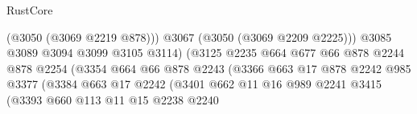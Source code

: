 \begin{lexlean}{RustCore}
\begin{coremodule}
                                                (@3050 (@3069 @2219 @878)))
                                              @3067
                                              (@3050 (@3069 @2209 @2225)))
                                            @3085
                                            @3089
                                            @3094
                                            @3099
                                            @3105
                                            @3114)
                                          (@3125
                                            @2235
                                            @664
                                            @677
                                            @66
                                            @878
                                            @2244
                                            @878
                                            @2254
                                            (@3354
                                              @664
                                              @66
                                              @878
                                              @2243
                                              (@3366
                                                @663
                                                @17
                                                @878
                                                @2242
                                                @985
                                                @3377
                                                (@3384
                                                  @663
                                                  @17
                                                  @2242
                                                  (@3401
                                                    @662
                                                    @11
                                                    @16
                                                    @989
                                                    @2241
                                                    @3415
                                                    (@3393
                                                      @660
                                                      @113
                                                      @11
                                                      @15
                                                      @2238
                                                      @2240

\end{coremodule}
\end{lexlean}
